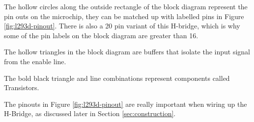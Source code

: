 \documentclass[../TinyBot.tex]{subfiles}
\begin{document}
The hollow circles along the outside rectangle of the block diagram represent the pin outs on the microchip, they can be matched up with labelled pins in Figure \ref{fig:l293d-pinout}. There is also a 20 pin variant of this H-bridge, which is why some of the pin labels on the block diagram are greater than 16.

The hollow triangles in the block diagram are buffers that isolate the input signal from the enable line. 

The bold black triangle and line combinations represent components called Transistors. 

\bigskip

The pinouts in Figure \ref{fig:l293d-pinout} are really important when wiring up the H-Bridge, as discussed later in Section \ref{sec:construction}.




    
        
\end{document}

